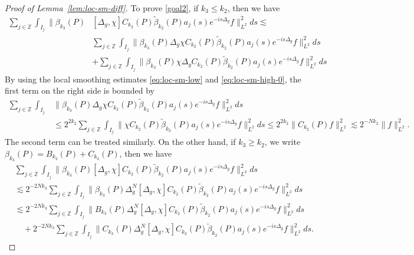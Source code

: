 \documentclass[10pt]{amsart}
\newcommand{\1}{{\bf 1}}
\begin{document}
\begin{proof}[Proof of Lemma~\ref{lem:loc-sm-diff}]
To prove \eqref{goal2}, if $k_3\le k_2$, then we have 
\begin{equation*}
\begin{split}
  \sum_{j\in \mathbb{Z}} \int_{I_j}  \|\beta_{k_3}(P) &[\Delta_g, \chi] C_{k_2}(P)\tilde\beta_{k_2}(P) a_j(s) e^{-is\Delta_g}f\|^2_{L^2}ds 
\lesssim \\
    & \sum_{j\in \mathbb{Z}} \int_{I_j}  \|\beta_{k_3}(P) \Delta_g \chi C_{k_2}(P)\tilde\beta_{k_2}(P)a_j(s)  e^{-is\Delta_g}f\|^2_{L^2}ds \\
    &+   \sum_{j\in \mathbb{Z}} \int_{I_j}  \|\beta_{k_3}(P) \chi\Delta_g C_{k_2}(P)\tilde\beta_{k_2}(P) a_j(s) e^{-is\Delta_g}f\|^2_{L^2}ds 
\end{split}
\end{equation*}
By using the local smoothing estimates \eqref{eq:loc-sm-low} and \eqref{eq:loc-sm-high-0}, the first term on the right side is bounded by
\begin{equation*}
\begin{split}
      \sum_{j\in \mathbb{Z}} \int_{I_j}&  \|\beta_{k_3}(P) \Delta_g \chi C_{k_2}(P)\tilde\beta_{k_2}(P)a_j(s)  e^{-is\Delta_g}f\|^2_{L^2}ds 
   \\
   &\le  2^{2k_2} \sum_{j\in \mathbb{Z}} \int_{I_j}\|\chi C_{k_2}(P)\tilde \beta_{k_2}(P) a_j(s) e^{-is\Delta_g}f\|^2_{L^2}ds  
   \le  2^{2k_2} \| C_{k_2}(P)f\|^2_{L^2} \lesssim 2^{-Nk_2} \|f\|_{L^2}^2.
\end{split}
\end{equation*}
The second term can be treated similarly.
On the other hand, if $k_3\ge k_2$, we write 
$\beta_{k_3}(P)=B_{k_3}(P)+C_{k_3}(P)$, then we have
\begin{equation*}
    \begin{split}
         & \sum_{j\in \mathbb{Z}} \int_{I_j} \|\beta_{k_3}(P) [\Delta_g, \chi] C_{k_2}(P)\tilde\beta_{k_2}(P) a_j(s) e^{-is\Delta_g}f\|^2_{L^2}ds\\
         &\lesssim 2^{-2Nk_3} \sum_{j\in \mathbb{Z}} \int_{I_j} \|\beta_{k_3}(P) \Delta_g^N [\Delta_g,\chi]C_{k_2}(P) \tilde\beta_{k_2}(P) a_j(s)  e^{-is\Delta_g}f\|_{L^2}^2 ds\\
         &\lesssim 2^{-2Nk_3} \sum_{j\in \mathbb{Z}} \int_{I_j} \|B_{k_3}(P) \Delta_g^N [\Delta_g,\chi]C_{k_2}(P) \tilde\beta_{k_2}(P) a_j(s)  e^{-is\Delta_g}f\|_{L^2}^2 ds\\
         &\quad +2^{-2Nk_3} \sum_{j\in \mathbb{Z}} \int_{I_j} \|C_{k_3}(P) \Delta_g^N [\Delta_g,\chi]C_{k_2}(P) \tilde\beta_{k_2}(P) a_j(s)  e^{-is\Delta_g}f\|_{L^2}^2 ds.
    \end{split}

\end{equation*}
\end{proof}
\end{document}
